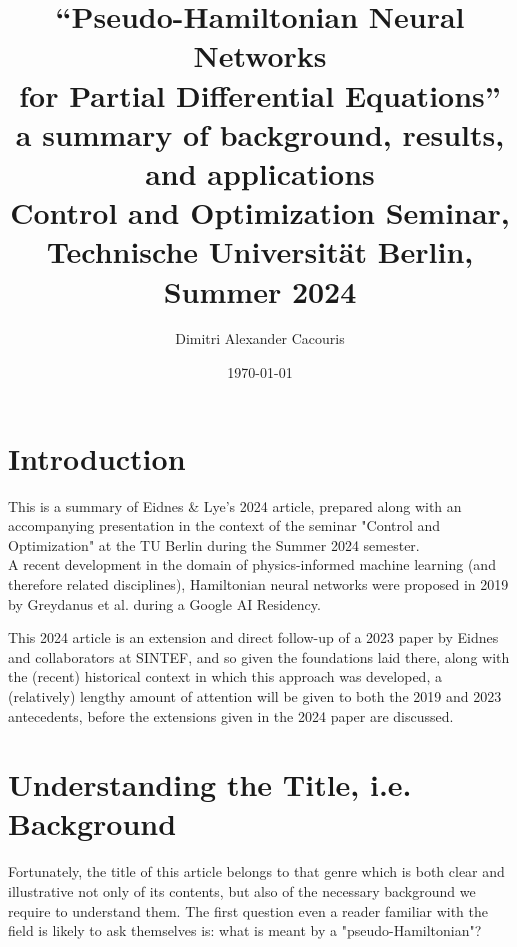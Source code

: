 \documentclass[10 pt, a4paper]{article}
\title{“Pseudo-Hamiltonian Neural Networks\\for Partial Differential Equations”\\ \large a summary of background, results, and applications \\ \normalsize Control and Optimization Seminar,\\ Technische Universität Berlin, Summer 2024}
\author{Dimitri Alexander Cacouris}
\date{\today}
\begin{document}
\maketitle
\section{Introduction}
This is a summary of Eidnes \& Lye's 2024 article, prepared along with an accompanying presentation in the context of the seminar "Control and Optimization" at the TU Berlin during the Summer 2024 semester.\\
A recent development in the domain of physics-informed machine learning (and therefore related disciplines), Hamiltonian neural networks were proposed in 2019 by Greydanus et al. during a Google AI Residency.
\begin{comment}
	, and have since been refined and adapted for specific purposes, as broad strides in artificial intelligence have also motivated more tailored algorithms for concrete applications
\end{comment}
 This 2024 article is an extension and direct follow-up of a 2023 paper by Eidnes and collaborators at SINTEF, and so given the foundations laid there, along with the (recent) historical context in which this approach was developed, a (relatively) lengthy amount of attention will be given to both the 2019 and 2023 antecedents, before the extensions given in the 2024 paper are discussed.
\section{Understanding the Title, i.e. Background}
Fortunately, the title of this article belongs to that genre which is both clear and illustrative not only of its contents, but also of the necessary background we require to understand them. The first question even a reader familiar with the field is likely to ask themselves is: what is meant by a "pseudo-Hamiltonian"?
\end{document}
